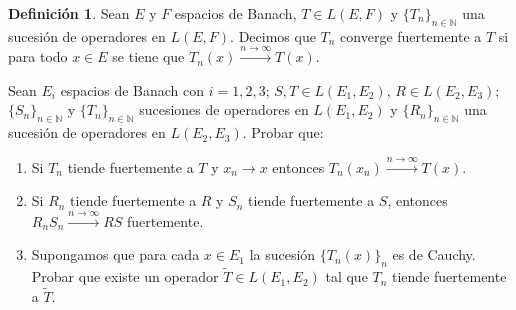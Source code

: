 \documentclass{article}
\theoremstyle{definition}
\newtheorem{definition}{Definición}[section]
\newcommand{\N}{\mathbb{N}}
\newenvironment{ejercicio}[1]{\begin{trivlist}
\item[\hskip \labelsep {\bfseries Ejercicio}\hskip \labelsep {\bfseries #1.}]}{\end{trivlist}}
\begin{document}
\vspace{0.5cm}

\begin{definition}
    Sean \(E\) y \(F\) espacios de Banach, \(T\in L(E,F)\) y \( {\{T_{n} \}}_{n\in\N}\) una sucesión de operadores en \(L(E,F)\). Decimos que \(T_{n}\) converge fuertemente a \(T\) si para todo \(x\in E\) se tiene que \(T_{n}(x)\xrightarrow{n\to\infty}T(x)\).
\end{definition}

\begin{ejercicio}{14}
    Sean \(E_{i}\) espacios de Banach con \(i=1,2,3\); \(S, T\in L(E_{1},E_{2})\), \(R\in L(E_{2},E_{3})\); \( {\{S_{n}\}}_{n\in\N}\) y \( {\{T_{n}\}}_{n\in\N}\) sucesiones de operadores en \(L(E_{1},E_{2})\) y \( {\{R_{n}\}}_{n\in\N}\) una sucesión de operadores en \(L(E_{2},E_{3})\). Probar que:
    \begin{enumerate}
        \item Si \(T_{n}\) tiende fuertemente a \(T\) y \(x_{n}\to x\) entonces \(T_{n}(x_{n})\xrightarrow{n\to\infty}T(x)\).
        \item Si \(R_{n}\) tiende fuertemente a \(R\) y \(S_{n}\) tiende fuertemente a \(S\), entonces \(R_{n}S_{n}\xrightarrow{n\to\infty} RS\) fuertemente.
        \item Supongamos que para cada \(x\in E_{1}\) la sucesión \( {\{T_{n}(x)\}}_{n}\) es de Cauchy. Probar que existe un operador \(\tilde{T}\in L(E_{1},E_{2})\) tal que \(T_{n}\) tiende fuertemente a \(\tilde{T}\).
    \end{enumerate}
\end{ejercicio}
\end{document}
